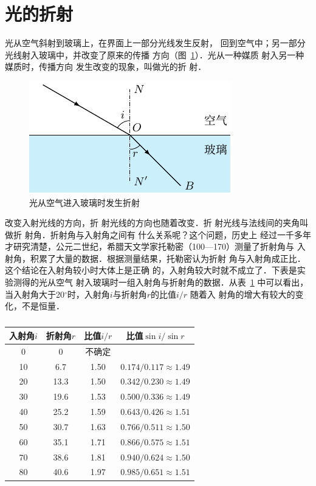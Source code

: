 \section{光的折射}
光从空气斜射到玻璃上，在界面上一部分光线发生反射，
回到空气中；另一部分光线射入玻璃中，并改变了原来的传播
方向（图~\ref{fig_C_5-19}）．光从一种媒质
射入另一种媒质时，传播方向
发生改变的现象，叫做光的折
射．
\begin{figure}[htbp]
    \centering
    \includegraphics{fig/C/5-19.pdf}
    \caption{光从空气进入玻璃时发生折射}\label{fig_C_5-19}
\end{figure}

改变入射光线的方向，折
射光线的方向也随着改变．折
射光线与法线间的夹角叫做折
射角．折射角与入射角之间有
什么关系呢？这个问题，历史上
经过一千多年才研究清楚，公元二世纪，希腊天文学家托勒密（100—170）测量了折射角与
入射角，积累了大量的数据．根据测量结果，托勒密认为折射
角与入射角成正比．这个结论在入射角较小时大体上是正确
的，入射角较大时就不成立了．下表是实验测得的光从空气
射入玻璃时一组入射角与折射角的数据．从表~\ref{tab_C_5-1} 中可以看出，
当入射角大于20$^\circ$时，入射角$i$与折射角$r$的比值$i/r$
随着入
射角的增大有较大的变化，不是恒量．

\begin{table}[htbp]
	\centering
	\caption{}\label{tab_C_5-1}
	\begin{tabular}{cccc}
		\toprule
		入射角$i$ & 折射角$r$ & 比值$i/r$ & 比值$\sin i/\sin r$\\
		\midrule
		0  &  0  &  不确定 &    \\
		10  &  6.7  &  1.50 &  $0.174/0.117\approx 1.49$  \\
		20  &  13.3  &  1.50 &   $0.342/0.230\approx 1.49$ \\
		30  &  19.6  &  1.53 &  $0.500/0.336\approx 1.49$  \\
		40  &  25.2  &  1.59 &  $0.643/0.426\approx 1.51$  \\
		50  &  30.7  &  1.63 &  $0.766/0.511\approx 1.50$  \\
		60  &  35.1  &  1.71 &  $0.866/0.575\approx 1.51$  \\
		70  &  38.6  &  1.81 &  $0.940/0.624\approx 1.50$  \\
		80  &  40.6  &  1.97 &  $0.985/0.651\approx 1.51$  \\
		\bottomrule
    \end{tabular}
\end{table}

